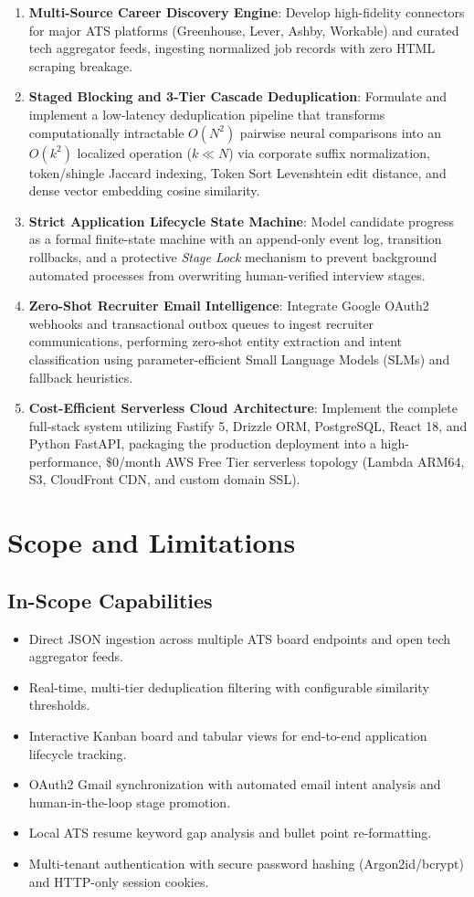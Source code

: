 \begin{enumerate}
    \item \textbf{Multi-Source Career Discovery Engine}: Develop high-fidelity connectors for major ATS platforms (Greenhouse, Lever, Ashby, Workable) and curated tech aggregator feeds, ingesting normalized job records with zero HTML scraping breakage.
    \item \textbf{Staged Blocking and 3-Tier Cascade Deduplication}: Formulate and implement a low-latency deduplication pipeline that transforms computationally intractable $O(N^2)$ pairwise neural comparisons into an $O(k^2)$ localized operation ($k \ll N$) via corporate suffix normalization, token/shingle Jaccard indexing, Token Sort Levenshtein edit distance, and dense vector embedding cosine similarity.
    \item \textbf{Strict Application Lifecycle State Machine}: Model candidate progress as a formal finite-state machine with an append-only event log, transition rollbacks, and a protective \textit{Stage Lock} mechanism to prevent background automated processes from overwriting human-verified interview stages.
    \item \textbf{Zero-Shot Recruiter Email Intelligence}: Integrate Google OAuth2 webhooks and transactional outbox queues to ingest recruiter communications, performing zero-shot entity extraction and intent classification using parameter-efficient Small Language Models (SLMs) and fallback heuristics.
    \item \textbf{Cost-Efficient Serverless Cloud Architecture}: Implement the complete full-stack system utilizing Fastify 5, Drizzle ORM, PostgreSQL, React 18, and Python FastAPI, packaging the production deployment into a high-performance, \$0/month AWS Free Tier serverless topology (Lambda ARM64, S3, CloudFront CDN, and custom domain SSL).
\end{enumerate}

\section{Scope and Limitations}
\subsection{In-Scope Capabilities}
\begin{itemize}
    \item Direct JSON ingestion across multiple ATS board endpoints and open tech aggregator feeds.
    \item Real-time, multi-tier deduplication filtering with configurable similarity thresholds.
    \item Interactive Kanban board and tabular views for end-to-end application lifecycle tracking.
    \item OAuth2 Gmail synchronization with automated email intent analysis and human-in-the-loop stage promotion.
    \item Local ATS resume keyword gap analysis and bullet point re-formatting.
    \item Multi-tenant authentication with secure password hashing (Argon2id/bcrypt) and HTTP-only session cookies.
\end{itemize}

